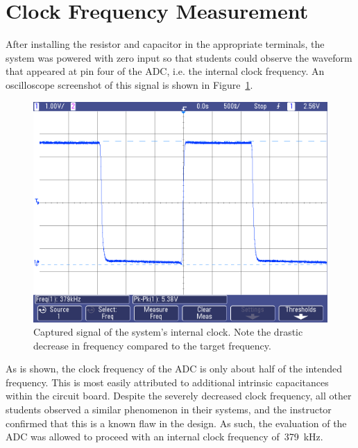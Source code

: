 \section{Clock Frequency Measurement}
After installing the resistor and capacitor in the appropriate terminals, the
system was powered with zero input so that students could observe the waveform
that appeared at pin four of the ADC, i.e. the internal clock frequency.  An
oscilloscope screenshot of this signal is shown in Figure~\ref{f:clock}.
%
\begin{figure}[H]
\centering
	\includegraphics[width=.8\textwidth]{img/shot/RC_clock_shot.png}
	\parbox{.8\textwidth}{
	\caption[Internal clock waveform]{Captured signal of the system's internal
	clock.  Note the drastic decrease in frequency compared to the target
	frequency.}
	\label{f:clock}}
\end{figure}
%
As is shown, the clock frequency of the ADC is only about half of the intended
frequency.  This is most easily attributed to additional intrinsic capacitances
within the circuit board.  Despite the severely decreased clock frequency, all
other students observed a similar phenomenon in their systems, and the
instructor confirmed that this is a known flaw in the design.  As such, the
evaluation of the ADC was allowed to proceed with an internal clock frequency
of~\SI{379}{\kilo\hertz}.
